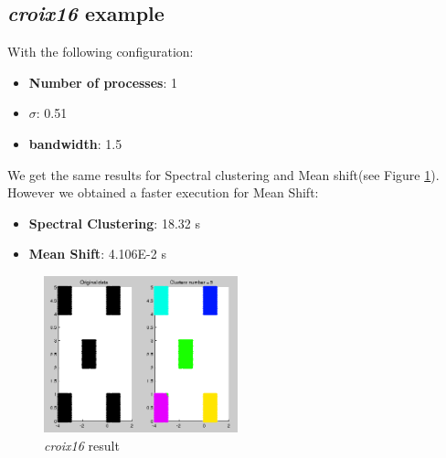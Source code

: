 \subsection{\textit{croix16} example}
With the following configuration:
\begin{itemize}
\item \textbf{Number of processes}: 1
\item \textbf{$\sigma$}: 0.51
\item \textbf{bandwidth}: 1.5
\end{itemize}
We get the same results for Spectral clustering and Mean shift(see Figure \ref{croix16}). However we obtained a faster execution for Mean Shift:
\begin{itemize}
\item \textbf{Spectral Clustering}: 18.32 s
\item \textbf{Mean Shift}: 4.106E-2 s
\end{itemize}
\begin{figure}[h!]
\includegraphics[width=0.5\textwidth]{Image/croix16.png}\centering
\caption{\textit{croix16} result\label{croix16}}
\end{figure}
